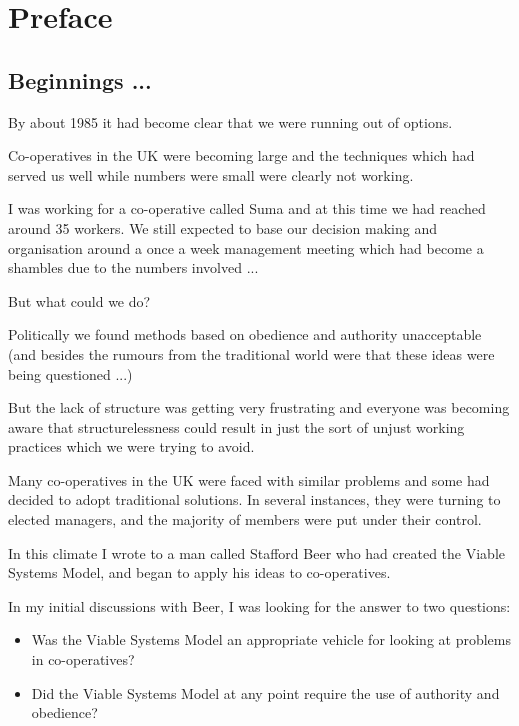 \chapter{Preface}

\section*{Beginnings ...}
By about 1985 it had become clear that we were running out of options.

Co-operatives in the UK were becoming large and the techniques which had served us well while numbers were small were clearly not working.

I was working for a co-operative called Suma and at this time we had reached around 35 workers. We still expected to base our decision making and organisation around a once a week management meeting which had become a shambles due to the numbers involved ...

But what could we do?

Politically we found methods based on obedience and authority unacceptable (and besides the rumours from the traditional world were that these ideas were being questioned ...)

But the lack of structure was getting very frustrating and everyone was becoming aware that structurelessness could result in just the sort of unjust working practices which we were trying to avoid.

Many co-operatives in the UK were faced with similar problems and some had decided to adopt traditional solutions. In several instances, they were turning to elected managers, and the majority of members were put under their control.

In this climate I wrote to a man called Stafford Beer who had created the Viable Systems Model, and began to apply his ideas to co-operatives.

In my initial discussions with Beer, I was looking for the answer to two questions:
\begin{samepage}
\begin{itemize}
	\item Was the Viable Systems Model an appropriate vehicle for looking at problems in co-operatives?
	
	\item Did the Viable Systems Model at any point require the use of authority and obedience?
	
\end{itemize}
\end{samepage}

